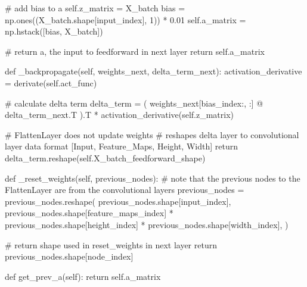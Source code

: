\documentclass[%
oneside,                 %
final,                   %
10pt]{article}
\begin{document}
        # add bias to a
        self.z_matrix = X_batch
        bias = np.ones((X_batch.shape[input_index], 1)) * 0.01
        self.a_matrix = np.hstack([bias, X_batch])

        # return a, the input to feedforward in next layer
        return self.a_matrix

    def _backpropagate(self, weights_next, delta_term_next):
        activation_derivative = derivate(self.act_func)

        # calculate delta term
        delta_term = (
            weights_next[bias_index:, :] @ delta_term_next.T
        ).T * activation_derivative(self.z_matrix)

        # FlattenLayer does not update weights
        # reshapes delta layer to convolutional layer data format [Input, Feature_Maps, Height, Width]
        return delta_term.reshape(self.X_batch_feedforward_shape)

    def _reset_weights(self, previous_nodes):
        # note that the previous nodes to the FlattenLayer are from the convolutional layers
        previous_nodes = previous_nodes.reshape(
            previous_nodes.shape[input_index],
            previous_nodes.shape[feature_maps_index]
            * previous_nodes.shape[height_index]
            * previous_nodes.shape[width_index],
        )

        # return shape used in reset_weights in next layer
        return previous_nodes.shape[node_index]

    def get_prev_a(self):
        return self.a_matrix

\epycod
\end{document}
